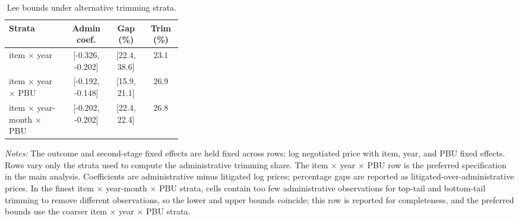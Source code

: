 \begin{table}[ht]
\centering
\caption{Lee bounds under alternative trimming strata.}
\label{tab:utg_lee_alt_strata}
\begin{threeparttable}
\small
\begin{tabular}{p{0.34\linewidth}ccc}
\toprule
Strata & Admin coef. & Gap (\%) & Trim (\%) \\
\midrule
item $\times$ year & [-0.326, -0.202] & [22.4, 38.6] & 23.1 \\
item $\times$ year $\times$ PBU & [-0.192, -0.148] & [15.9, 21.1] & 26.9 \\
item $\times$ year-month $\times$ PBU & [-0.202, -0.202] & [22.4, 22.4] & 26.8 \\
\bottomrule
\end{tabular}
\begin{tablenotes}[flushleft]\footnotesize
\item \textit{Notes:} The outcome and second-stage fixed effects are held fixed across rows: log negotiated price with item, year, and PBU fixed effects. Rows vary only the strata used to compute the administrative trimming share. The item $\times$ year $\times$ PBU row is the preferred specification in the main analysis. Coefficients are administrative minus litigated log prices; percentage gaps are reported as litigated-over-administrative prices. In the finest item $\times$ year-month $\times$ PBU strata, cells contain too few administrative observations for top-tail and bottom-tail trimming to remove different observations, so the lower and upper bounds coincide; this row is reported for completeness, and the preferred bounds use the coarser item $\times$ year $\times$ PBU strata.
\end{tablenotes}
\end{threeparttable}
\end{table}
